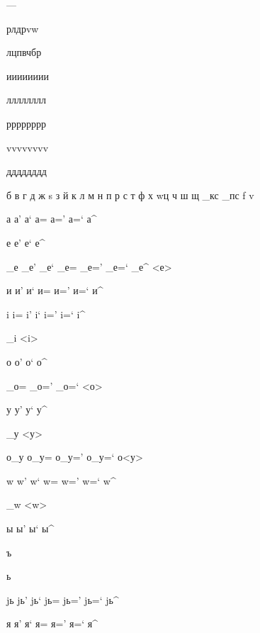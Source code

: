 \documentclass{article}
\begin{document}
\huge
---


р\д л\д д\с р\с v\г w\т

л\с  ц\д  п\с  в\д  ч\с  б\с  р\о

и\х и\н и\р и\ч и\г и\ъ и\ж и\з

л\х л\н л\р л\ч л\г л\ъ л\ж л\з

р\х р\н р\р р\ч р\г р\ъ р\ж р\з

v\х v\н v\р v\ч v\г v\ъ v\ж v\з

д\х д\н д\р д\ч д\г д\ъ д\ж д\з

б в г д ж s з й к л м н п р с т ф х w\т ц ч ш щ _кс _пс f v

а а' а` а= а=' а=` а^

е е' е` е^

_е _е' _е` _е= _е=' _е=` _е^ <е>

и и' и` и= и=' и=` и^

i i= i' i` i=' i=` i^ 

_i <i>

о о' о` о^

_о= _о=' _о=` <о>

у у' у` у^

_у <у>

о_у о_у= о_у=' о_у=` о<у>

w w' w` w= w=' w=` w^

_w <w>

ы ы' ы` ы^

ъ

ь

jь jь' jь` jь= jь=' jь=` jь^

я я' я` я= я=' я=` я^
\end{document}
